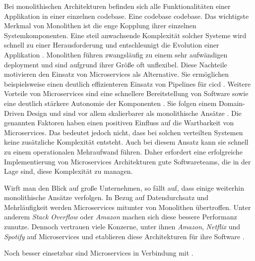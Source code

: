 Bei monolithischen Architekturen befinden sich alle Funktionalitäten einer Applikation in einer einzelnen \Gls{codebase}. Eine \Gls{codebase} \glsdesc{codebase}. Das wichtigste Merkmal von Monolithen ist die enge Kopplung ihrer einzelnen Systemkomponenten. Eine steil anwachsende Komplexität solcher Systeme wird schnell zu einer Herausforderung und entschleunigt die Evolution einer Applikation \cite{028:Analyzing-Microservices-and-Monolithic-Systems}. Monolithen führen zwangsläufig zu einem sehr aufwändigen \Gls{deployment} und sind aufgrund ihrer Größe oft unflexibel. Diese Nachteile motivieren den Einsatz von Microservices als Alternative. Sie ermöglichen beispielsweise einen deutlich effizienteren Einsatz von Pipelines für \Gls{cicd} \cite{019:Advanced-DevOps-Environment-for-Microservices-based-Applications}. Weitere Vorteile von Microservices sind eine schnellere Bereitstellung von Software sowie eine deutlich stärkere Autonomie der Komponenten \cite{019:Advanced-DevOps-Environment-for-Microservices-based-Applications,027:Containerized-Microservices-Deployment-Approach}. Sie folgen einem Domain-Driven Design \cite{019:Advanced-DevOps-Environment-for-Microservices-based-Applications} und sind vor allem skalierbarer als monolithische Ansätze \cite{019:Advanced-DevOps-Environment-for-Microservices-based-Applications,027:Containerized-Microservices-Deployment-Approach,028:Analyzing-Microservices-and-Monolithic-Systems}. Die genannten Faktoren haben einen positiven Einfluss auf die Wartbarkeit von Microservices. Das bedeutet jedoch nicht, dass bei solchen verteilten Systemen keine zusätzliche Komplexität entsteht. Auch bei diesem Ansatz kann sie schnell zu einem operationalen Mehraufwand führen. Daher erfordert eine erfolgreiche Implementierung von Microservices Architekturen gute Softwareteams, die in der Lage sind, diese Komplexität zu managen.

Wirft man den Blick auf große Unternehmen, so fällt auf, dass einige weiterhin monolithische Ansätze verfolgen. In Bezug auf Datendurchsatz und Mehrläufigkeit werden Microservices mitunter von Monolithen übertroffen. Unter anderem \textit{Stack Overflow} oder \textit{Amazon} machen sich diese bessere Performanz zunutze. Dennoch vertrauen viele Konzerne, unter ihnen \textit{Amazon}, \textit{Netflix} und \textit{Spotify} auf Microservices und etablieren diese Architekturen für ihre Software \cite{028:Analyzing-Microservices-and-Monolithic-Systems}.

Noch besser einsetzbar sind Microservices in Verbindung mit .
